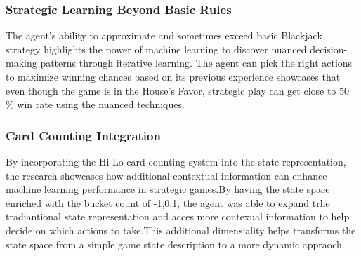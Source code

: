 \documentclass[10pt]{article}
\theoremstyle{definition}
\begin{document}
\subsubsection{Strategic Learning Beyond Basic Rules}
The agent's ability to approximate and sometimes exceed basic Blackjack strategy highlights the power of machine learning to 
discover nuanced decision-making patterns through iterative learning. 
The agent can pick the right actions to maximize winning chances based on its previous experience showcases that even 
though the game is in the House's Favor, strategic play can get close to 50
\% win rate using the nuanced techniques.
\subsubsection{Card Counting Integration}
By incorporating the Hi-Lo card counting system into the state representation, 
the research showcases how additional contextual information can enhance machine 
learning performance in strategic games.By having the state space enriched with the bucket count of {-1,0,1},
the agent was able to expand trhe tradiantional state representation and acces more contexual information to help 
decide on which actions to take.This additional dimensiality helps transforms the state space from a simple game 
state description to a more dynamic appraoch.

\end{document}
